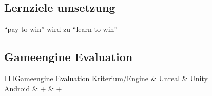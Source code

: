 \subsection{Lernziele umsetzung}
	\enquote{pay to win} wird zu \enquote{learn to win}
\subsection{Gameengine Evaluation}\label{ssec:engineeval}
	\begin{tabl}{l l l}{Gameengine Evaluation}
		\toprule
			Kriterium/Engine & Unreal & Unity \\
		\midrule
			Android & + & + \\
		\bottomrule
	\end{tabl}
